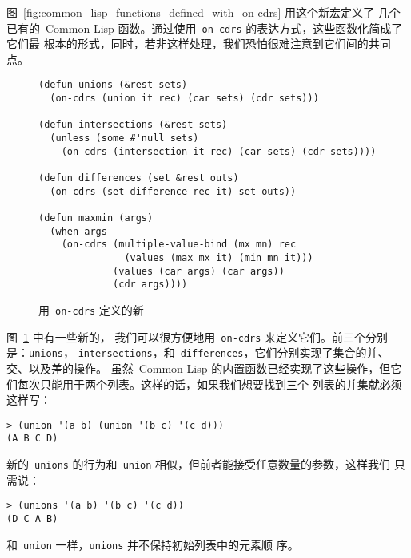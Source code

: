 图~\ref{fig:common_lisp_functions_defined_with_on-cdrs} 用这个新宏定义了
几个已有的~Common Lisp 函数。通过使用~\texttt{on-cdrs} 的表达方式，这些函数化简成了它们最
根本的形式，同时，若非这样处理，我们恐怕很难注意到它们间的共同点。

\begin{figure}
\begin{lstlisting}
(defun unions (&rest sets)
  (on-cdrs (union it rec) (car sets) (cdr sets)))

(defun intersections (&rest sets)
  (unless (some #'null sets)
    (on-cdrs (intersection it rec) (car sets) (cdr sets))))

(defun differences (set &rest outs)
  (on-cdrs (set-difference rec it) set outs))

(defun maxmin (args)
  (when args
    (on-cdrs (multiple-value-bind (mx mn) rec
               (values (max mx it) (min mn it)))
             (values (car args) (car args))
             (cdr args))))
\end{lstlisting}
  \caption{用~\texttt{on-cdrs} 定义的新\utility}
  \label{fig:new_utilities_defined_with_on-cdrs}
\end{figure}

图~\ref{fig:new_utilities_defined_with_on-cdrs} 中有一些新的\utility，
我们可以很方便地用~\texttt{on-cdrs} 来定义它们。前三个分别是：\texttt{unions}，
\texttt{intersections}，和~\texttt{differences}，它们分别实现了集合的并、交、以及差的操作。
虽然~Common Lisp 的内置函数已经实现了这些操作，但它们每次只能用于两个列表。这样的话，如果我们想要找到三个
列表的并集就必须这样写：
\begin{lstlisting}
> (union '(a b) (union '(b c) '(c d)))
(A B C D)
\end{lstlisting}
新的~\texttt{unions} 的行为和~\texttt{union} 相似，但前者能接受任意数量的参数，这样我们
只需说：
\begin{lstlisting}
> (unions '(a b) '(b c) '(c d))
(D C A B)
\end{lstlisting}

和~\texttt{union} 一样，\texttt{unions} 并不保持初始列表中的元素顺
序。

